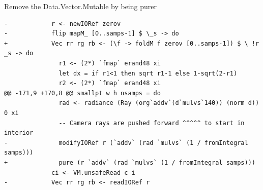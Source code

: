 \documentclass[8pt]{beamer}
\begin{document}
\begin{frame}[fragile]{Remove the Data.Vector.Mutable by being purer}
\begin{verbatim}
-            r <- newIORef zerov
-            flip mapM_ [0..samps-1] $ \_s -> do
+            Vec rr rg rb <- (\f -> foldM f zerov [0..samps-1]) $ \ !r _s -> do
               r1 <- (2*) `fmap` erand48 xi
               let dx = if r1<1 then sqrt r1-1 else 1-sqrt(2-r1)
               r2 <- (2*) `fmap` erand48 xi
@@ -171,9 +170,8 @@ smallpt w h nsamps = do
               rad <- radiance (Ray (org`addv`(d`mulvs`140)) (norm d)) 0 xi
               -- Camera rays are pushed forward ^^^^^ to start in interior
-              modifyIORef r (`addv` (rad `mulvs` (1 / fromIntegral samps)))
+              pure (r `addv` (rad `mulvs` (1 / fromIntegral samps)))
             ci <- VM.unsafeRead c i
-            Vec rr rg rb <- readIORef r
\end{verbatim}
\end{frame}
\end{document}
